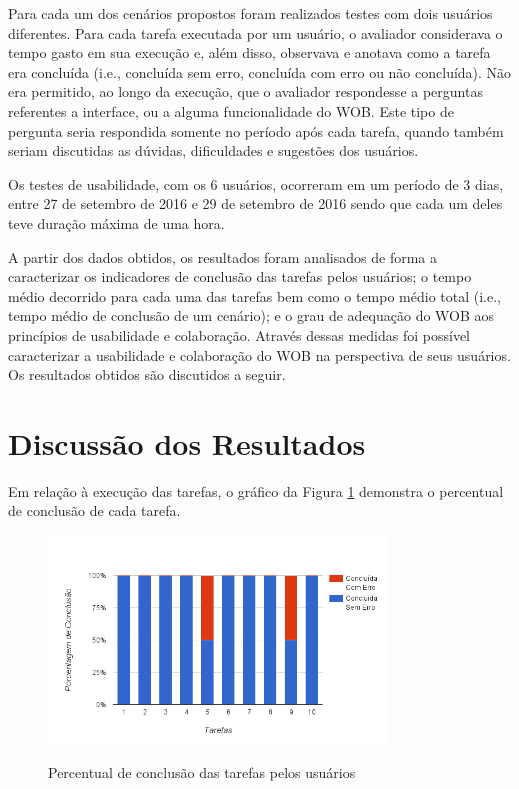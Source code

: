 Para cada um dos cenários propostos foram realizados testes com dois usuários diferentes. 
Para cada tarefa executada por um usuário, o avaliador considerava o tempo gasto em sua 
execução e, além disso, observava e anotava como a tarefa era concluída (i.e., concluída 
sem erro, concluída com erro ou não concluída). Não era permitido, ao longo da execução,
que o avaliador respondesse a perguntas referentes a interface, ou a alguma funcionalidade 
do WOB. Este tipo de pergunta seria respondida somente no período após cada tarefa, quando 
também seriam discutidas as dúvidas, dificuldades e sugestões dos usuários. 

Os testes de usabilidade, com os 6 usuários, ocorreram em um período de 3 dias, entre 27 de 
setembro de 2016 e 29 de setembro de 2016 sendo que cada um deles teve duração máxima de 
uma hora.

A partir dos dados obtidos, os resultados foram analisados de forma a caracterizar os 
indicadores de conclusão das tarefas pelos usuários; o tempo médio decorrido para cada uma 
das tarefas bem como o tempo médio total (i.e., tempo médio de conclusão de um cenário); e 
o grau de adequação do WOB aos princípios de usabilidade e colaboração. Através dessas 
medidas foi possível caracterizar a usabilidade e colaboração do WOB na perspectiva de 
seus usuários. Os resultados obtidos são discutidos a seguir.

\section{Discussão dos Resultados}
\label{sec:metodologia-resultados}

Em relação à execução das tarefas, o gráfico da Figura \ref{fig:avaliacao-tarefas} demonstra 
o percentual de conclusão de cada tarefa.

\begin{figure}[!htb]
    \centering
    \caption{Percentual de conclusão das tarefas pelos usuários}
    \includegraphics[width=0.8\textwidth]{./04-figuras/avaliacao-tarefas}
    \label{fig:avaliacao-tarefas}
\end{figure}


